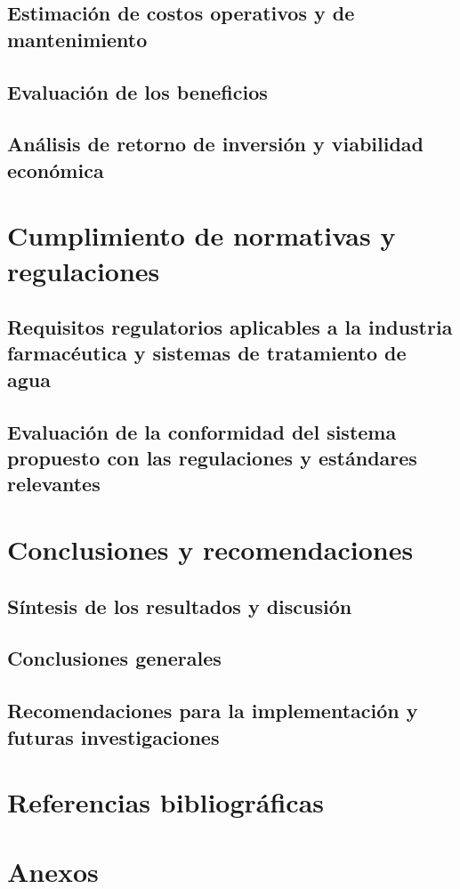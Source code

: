 \documentclass[
	spanish, %
	letterpaper, oneside
]{book}
\begin{document}
\section{Estimación de costos operativos y de mantenimiento}
\section{Evaluación de los beneficios}
\section{Análisis de retorno de inversión y viabilidad económica}

\chapter{Cumplimiento de normativas y regulaciones}
\section{Requisitos regulatorios aplicables a la industria farmacéutica y sistemas de tratamiento de agua}
\section{ Evaluación de la conformidad del sistema propuesto con las regulaciones y estándares relevantes}

\chapter{Conclusiones y recomendaciones}
\section*{Síntesis de los resultados y discusión}
\section*{Conclusiones generales}
\section*{Recomendaciones para la implementación y futuras investigaciones}

\chapter{Referencias bibliográficas}
\chapter{Anexos}


\end{document}
